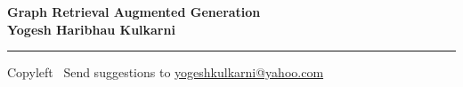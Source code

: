 
\graphicspath{{images/}}

\footnotesize


\begin{center}
\Large{\textbf{Graph Retrieval Augmented Generation\\ Yogesh Haribhau Kulkarni}}  
\end{center}

\begin{multicols}{2}

\end{multicols}

\rule{\linewidth}{0.25pt}
\scriptsize
Copyleft \textcopyleft\  Send suggestions to 
\href{http://www.yogeshkulkarni.com}{yogeshkulkarni@yahoo.com}


